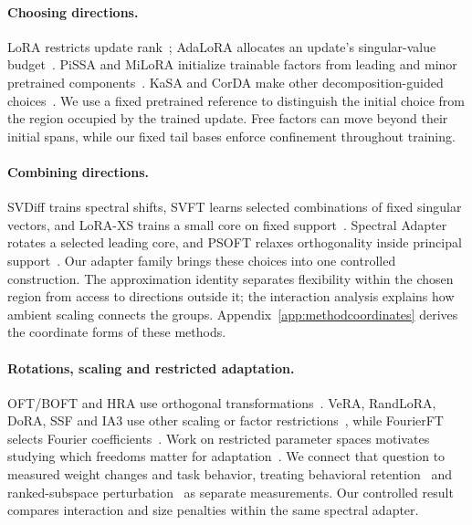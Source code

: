 \documentclass{article}
\begin{document}
\paragraph{Choosing directions.}
LoRA restricts update rank~\citep{hu2022lora}; AdaLoRA allocates an update's singular-value budget~\citep{zhang2023adalora}. PiSSA and MiLoRA initialize trainable factors from leading and minor pretrained components~\citep{meng2024pissa,wang2025milora}. KaSA and CorDA make other decomposition-guided choices~\citep{wang2025kasa,yang2024corda}. We use a fixed pretrained reference to distinguish the initial choice from the region occupied by the trained update. Free factors can move beyond their initial spans, while our fixed tail bases enforce confinement throughout training.

\paragraph{Combining directions.}
SVDiff trains spectral shifts, SVFT learns selected combinations of fixed singular vectors, and LoRA-XS trains a small core on fixed support~\citep{han2023svdiff,lingam2024svft,balazy2024lora}. Spectral Adapter rotates a selected leading core, and PSOFT relaxes orthogonality inside principal support~\citep{zhang2024spectral,wu2026psoft}. Our adapter family brings these choices into one controlled construction. The approximation identity separates flexibility within the chosen region from access to directions outside it; the interaction analysis explains how ambient scaling connects the groups. Appendix~\ref{app:methodcoordinates} derives the coordinate forms of these methods.

\paragraph{Rotations, scaling and restricted adaptation.}
OFT/BOFT and HRA use orthogonal transformations~\citep{qiu2023oft,liu2024boft,yuan2024hra}. VeRA, RandLoRA, DoRA, SSF and IA3 use other scaling or factor restrictions~\citep{kopiczko2023vera,albert2025randlora,liu2024dora,lian2022ssf,liu2022ia3}, while FourierFT selects Fourier coefficients~\citep{gao2024parameter}. Work on restricted parameter spaces motivates studying which freedoms matter for adaptation~\citep{li2018measuring,aghajanyan2020intrinsic}. We connect that question to measured weight changes and task behavior, treating behavioral retention~\citep{shuttleworth2025illusion} and ranked-subspace perturbation~\citep{wedin1972perturbation} as separate measurements. Our controlled result compares interaction and size penalties within the same spectral adapter.
\end{document}
